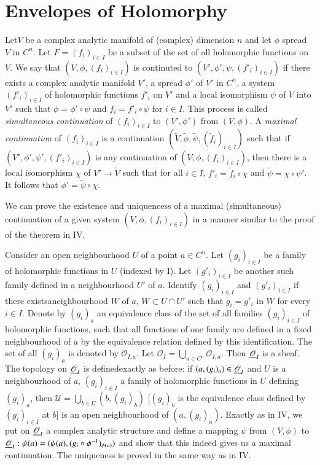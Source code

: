 
\chapter{Envelopes of Holomorphy}\label{chap5}

Let\pageoriginale $V$ be a complex analytic manifold of (complex)
dimension $n$ and 
let $\phi$ spread $V$ in $C^n$. Let $F = (f_i)_{i\in I}$ be a subset
of the set of all holomorphic functions on $V$. We say that $(V, \phi,
(f_i)_{i \in I})$ is continuted to $(V', \phi', \psi, (f'_i)_{i\in
  I})$ if there exists a complex analytic manifold $V'$, a spread
$\phi'$ of $V'$ in $C^n$, a system $(f'_i)_{i \in I}$ of holomorphic
functions $f'_i$ on $V'$ and a local isomorphism $\psi$ of $V$ into
$V'$ such that $\phi = \phi' \circ \psi$ and $f_i = f'_i \circ \psi$
for $i \in I$. This process is called \textit{simultaneous
  continuation} of $(f_i)_{i \in I}$ to $(V', \phi')$ from $(V,
\phi)$. A \textit{maximal continuation} of $(f_i)_{i \in I}$ is a
continuation $(\tilde{V}, \tilde{\phi}, \tilde{\psi},
(\tilde{f}_i)_{i\in I})$ such that if $(V', \phi', \psi', (f'_i)_{i
  \in I})$ is any continuation of $(V, \phi, (f_i)_{i \in I})$, then
there is a local isomorphism $\chi$ of $V' \to \tilde{V}$ such that
for all $i \in I$, $f'_i = \tilde{f}_i \circ \chi$ and $\tilde{\psi} =
\chi \circ \psi'$. It follows that $\phi' = \tilde{\psi} \circ \chi$. 

We can prove the existence and uniquencess of a maximal (simultaneous)
continuation of a given system $(V, \phi, (f_i)_{i \in I})$ in a
manner similar to the proof of the theorem in IV.

Consider an open neighbourhood $U$ of a point $a \in C^n$. Let
$(g_i)_{i \in I}$ be a family of holomorphic functions in $U$ (indexed
by I). Let $(g'_i)_{i \in I}$ be another such family defined in a
neighbourhood $U'$ of $a$. Identify $(g_i)_{i \in I}$ and $(g'_i)_{i
  \in I}$ if there existsaneighbourhood $W$ of $a$, $W \subset U \cap
U'$ such that $g_i = g'_i$ in $W$ for every $i \in I$. Denote by
$(g_i)_a$ an equivalence class of the set of all families $(g_i)_{i
  \in I}$ of holomorphic functions, such that all functions of one
family are defined in a fixed neighbourhood of $a$ by the equivalence
relation defined by this identification. The set of all $(g_i)_a$ is
denoted by $\mathscr{O}_{I,a}$. Let $\mathscr{O}_{I} =
\bigcup\limits_{a \in C^n} \mathscr{O}_{I,a}$. Then
$\underline{\mathscr{O}}_I$ is a sheaf. The topology on $\underline{\mathscr{O}}_I$ is
defined\pageoriginale exactly as before: if $(a, (g_i)_a) \in
\underline{\mathscr{O}}_I$ and $U$ is a neighbourhood of $a$, $(g_i)_{i \in
  I}$ a family of holomorphic functions in $U$ defining $(g_i)_a$,
then $\mathscr{U} = \bigcup\limits_{b \in U} (b,(g_i)_b)$ [$(g_i)_b$
  is the equivalence class defined by $(g_i)_{i \in I}$ at $b$] is an
open neighbourhood of $(a, (g_i)_a)$. Exactly as in IV, we put on
$\underline{\mathscr{O}}_I$ a complex analytic structure and define a mapping
$\psi$ from $(V, \phi)$ to $\underline{\mathscr{O}}_I: \psi(a) = (\psi(a),
(g_i \circ \phi^{-1})_{\phi(a)})$ and show that this indeed gives us a
maximal continuation. The uniqueness is proved in the same way as in
IV.

